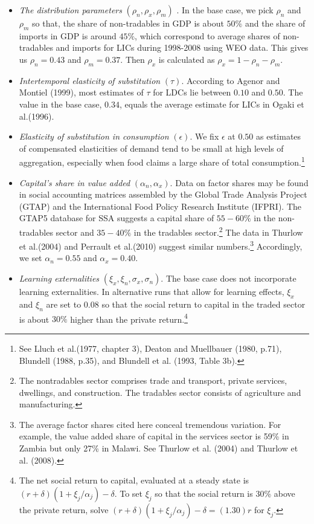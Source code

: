 \documentclass[11pt]{article}
\begin{document}
\begin{itemize}
\item \textit{The distribution parameters }$(\rho _{n},\rho _{x},\rho _{m})$%
. In the base case, we pick $\rho _{n}$ and $\rho _{m}$ so that, the share
of non-tradables in GDP is about $50\%$ and the share of imports in GDP is
around $45\%$, which correspond to average shares of non-tradables and
imports for LICs during 1998-2008 using WEO data. This gives us $\rho
_{n}=0.43$ and $\rho _{m}=0.37.$ Then $\rho _{x}$ is calculated as $\rho
_{x}=1-\rho _{n}-\rho _{m}.$

\item \textit{Intertemporal elasticity of substitution }$(\tau )$. According
to Agenor and Montiel (1999), most estimates of $\tau $ for LDCs lie between 
$0.10$ and $0.50$. The value in the base case, $0.34$, equals the average
estimate for LICs in Ogaki et al.\thinspace (1996).

\item \textit{Elasticity of substitution in consumption }$(\epsilon )$. We
fix $\epsilon $ at $0.50$ as estimates of compensated elasticities of demand
tend to be small at high levels of aggregation, especially when food claims
a large share of total consumption.\footnote{%
See Lluch et al.\thinspace (1977, chapter 3), Deaton and Muellbauer (1980,
p.71), Blundell (1988, p.35), and Blundell et al. (1993, Table 3b).}

\item \textit{Capital's share in value added }$(\alpha _{n},\alpha _{x})$.
Data on factor shares may be found in social accounting matrices assembled
by the Global Trade Analysis Project (GTAP) and the International Food
Policy Research Institute (IFPRI). The GTAP5 database for SSA suggests a
capital share of $55-60\%$ in the non-tradables sector and $35-40\%$ in the
tradables sector.\footnote{%
The nontradables sector comprises trade and transport, private services,
dwellings, and construction. The tradables sector consists of agriculture
and manufacturing.} The data in Thurlow et al.\thinspace (2004) and Perrault
et al.\thinspace (2010) suggest similar numbers.\footnote{%
The average factor shares cited here conceal tremendous variation. For
example, the value added share of capital in the services sector is 59\% in
Zambia but only 27\% in Malawi. See Thurlow et al. (2004) and Thurlow et al.
(2008).} Accordingly, we set $\alpha _{n}=0.55$ and $\alpha _{x}=0.40$.

\item \textit{Learning externalities }$(\xi _{x},\xi _{n},\sigma _{x},\sigma
_{n})$. The base case does not incorporate learning externalities. In
alternative runs that allow for learning effects, $\xi _{x}$ and $\xi _{n}$
are set to $0.08$ so that the social return to capital in the traded sector
is about $30\%$ higher than the private return.\footnote{%
The net social return to capital, evaluated at a steady state is $(r+\delta
)(1+\xi _{j}/\alpha _{j})-\delta $. To set $\xi _{j}$ so that the social
return is 30\% above the private return, solve $(r+\delta )(1+\xi
_{j}/\alpha _{j})-\delta =(1.30)r$ for $\xi _{j}$.}


\end{itemize}
\end{document}
